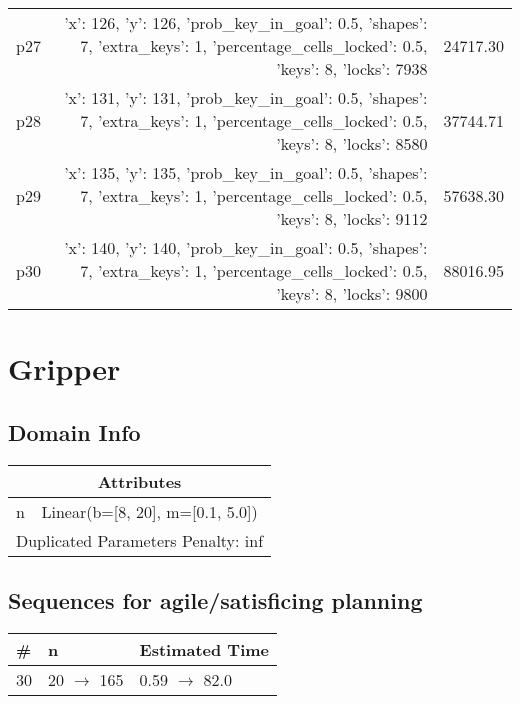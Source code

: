 \documentclass{article}
\begin{document}
\begin{center}
\begin{tabular}{@{}l|r|r@{}}
  p27&{'x': 126, 'y': 126, 'prob\_key\_in\_goal': 0.5, 'shapes': 7, 'extra\_keys': 1, 'percentage\_cells\_locked': 0.5, 'keys': 8, 'locks': 7938}&24717.30\\
  p28&{'x': 131, 'y': 131, 'prob\_key\_in\_goal': 0.5, 'shapes': 7, 'extra\_keys': 1, 'percentage\_cells\_locked': 0.5, 'keys': 8, 'locks': 8580}&37744.71\\
  p29&{'x': 135, 'y': 135, 'prob\_key\_in\_goal': 0.5, 'shapes': 7, 'extra\_keys': 1, 'percentage\_cells\_locked': 0.5, 'keys': 8, 'locks': 9112}&57638.30\\
  p30&{'x': 140, 'y': 140, 'prob\_key\_in\_goal': 0.5, 'shapes': 7, 'extra\_keys': 1, 'percentage\_cells\_locked': 0.5, 'keys': 8, 'locks': 9800}&88016.95
                            \end{tabular}
                            \end{center}
                    
                            \newpage \section{Gripper}
                    \subsection*{Domain Info}

                    \begin{center}
                    \begin{tabular}{@{}p{}p{}@{}}
                    \multicolumn{2}{c}{\bf \large Attributes}\\\midrule
                    n & Linear(b=[8, 20], m=[0.1, 5.0])
                    
                     \\\midrule
                    \multicolumn{2}{l}{Duplicated Parameters Penalty: inf}
                    \end{tabular}
                    \end{center}
                
                         \subsection*{Sequences for agile/satisficing planning}

                        \begin{center}
                        \begin{tabular}{@{}l|l|l@{}}
                        \# & n & Estimated Time\\\midrule
                        30&20 $\rightarrow$ 165&0.59 $\rightarrow$ 82.0
                        \end{tabular}
                        \end{center}
                    
\end{document}
